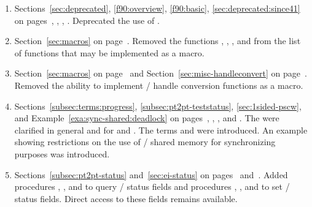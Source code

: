 \begin{enumerate}
\item
  Sections~\ref{sec:deprecated}, \ref{f90:overview}, \ref{f90:basic}, \ref{sec:deprecated:since41}
  on pages~\pageref{sec:deprecated}, \pageref{f90:overview}, \pageref{f90:basic}, \pageref{sec:deprecated:since41}.
  \newline
  Deprecated the use of .

\item
  Section~\ref{sec:macros} on page~\pageref{sec:macros}.
  \newline
  Removed the functions , ,
  , and  from the list of functions
  that may be implemented as a macro.

\item
  Section~\ref{sec:macros} on page~\pageref{sec:macros} and
  Section~\ref{sec:misc-handleconvert} on page~\pageref{sec:misc-handleconvert}.
  \newline
  Removed the ability to implement \mpi/ handle conversion functions as a macro.

\item
  Sections~\ref{subsec:terms:progress}, \ref{subsec:pt2pt-teststatus}, \ref{sec:1sided-pscw},
  and Example~\ref{exa:sync-shared:deadlock}
  on pages~\pageref{subsec:terms:progress}, \pageref{subsec:pt2pt-teststatus}, \pageref{sec:1sided-pscw},
  and \pageref{exa:sync-shared:deadlock}.
  \newline
  The 
   were clarified in general
  and for  and .
  The terms 
  and  were introduced.
  An example showing restrictions on the use of \MPI/ shared memory for
  synchronizing purposes was introduced.

\item
  Sections~\ref{subsec:pt2pt-status} and~\ref{sec:ei-status} on pages~\pageref{subsec:pt2pt-status} and~\pageref{sec:ei-status}.
  \newline
  Added procedures , , and  to query \MPI/ status fields
  and procedures , , and  to set \MPI/ status fields.
  Direct access to these fields remains available.


\end{enumerate}
